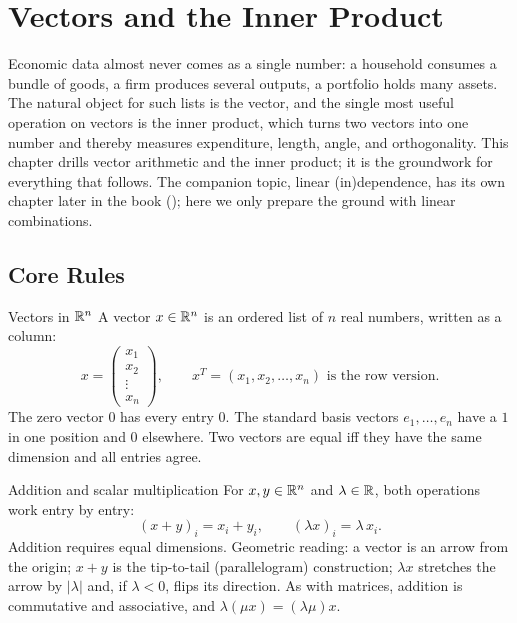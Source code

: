 \chapter{Vectors and the Inner Product}

Economic data almost never comes as a single number: a household consumes a
bundle of goods, a firm produces several outputs, a portfolio holds many
assets. The natural object for such lists is the vector, and the single most useful operation on vectors is the inner
product, which turns two
vectors into one number and thereby measures expenditure, length, angle, and
orthogonality. This chapter drills vector arithmetic and the inner product;
it is the groundwork for everything that follows. The companion topic,
linear (in)dependence, has its own chapter
later in the book (); here we only prepare the ground with linear
combinations.

\section{Core Rules}

\begin{rulebox}{Vectors in $\mathbb{R}^{n}$}
A vector $x \in \mathbb{R}^{n}$ is an ordered list of $n$ real numbers, written as
a column:
\[
x = \begin{pmatrix} x_{1} \\ x_{2} \\ \vdots \\ x_{n} \end{pmatrix},
\qquad
x^{T} = (x_{1}, x_{2}, \dots, x_{n}) \text{ is the row version.}
\]
The zero vector $0$ has every entry $0$. The standard basis vectors
$e_{1}, \dots, e_{n}$ have a $1$ in one position and $0$ elsewhere. Two
vectors are equal iff they have the same dimension and all entries agree.
\end{rulebox}

\begin{rulebox}{Addition and scalar multiplication}
For $x, y \in \mathbb{R}^{n}$ and $\lambda \in \mathbb{R}$, both operations work entry by
entry:
\[
(x + y)_{i} = x_{i} + y_{i}, \qquad (\lambda x)_{i} = \lambda \, x_{i}.
\]
Addition requires equal dimensions. Geometric reading: a vector is an arrow
from the origin; $x + y$ is the tip-to-tail (parallelogram) construction;
$\lambda x$ stretches the arrow by $|\lambda|$ and, if $\lambda < 0$, flips
its direction. As with matrices, addition is commutative and associative,
and $\lambda(\mu x) = (\lambda \mu) x$.
\end{rulebox}

